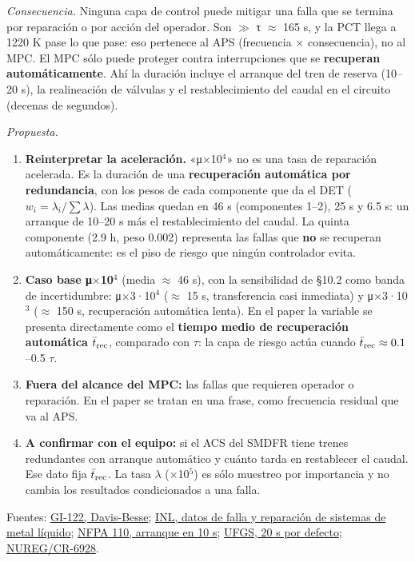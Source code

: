 \documentclass[11pt,a4paper]{article}
\begin{document}
\emph{Consecuencia.} Ninguna capa de control puede mitigar una falla que se termina por reparación o por acción del operador. Son $\gg$ τ $\approx$ 165 s, y la PCT llega a 1220 K pase lo que pase: eso pertenece al APS (frecuencia $\times$ consecuencia), no al MPC. El MPC sólo puede proteger contra interrupciones que se \textbf{recuperan automáticamente}. Ahí la duración incluye el arranque del tren de reserva (10–20 s), la realineación de válvulas y el restablecimiento del caudal en el circuito (decenas de segundos).

\emph{Propuesta.}

\begin{enumerate}
\item \textbf{Reinterpretar la aceleración.} «μ$\times$10$^{4}$» no es una tasa de reparación acelerada. Es la duración de una \textbf{recuperación automática por redundancia}, con los pesos de cada componente que da el DET ($w_i=\lambda_i/\sum\lambda$). Las medias quedan en 46 s (componentes 1–2), 25 s y 6.5 s: un arranque de 10–20 s más el restablecimiento del caudal. La quinta componente (2.9 h, peso 0.002) representa las fallas que \textbf{no} se recuperan automáticamente: es el piso de riesgo que ningún controlador evita.
\item \textbf{Caso base μ$\times$10$^{4}$} (media $\approx$ 46 s), con la sensibilidad de \S{}10.2 como banda de incertidumbre: μ$\times$3·10$^{4}$ ($\approx$ 15 s, transferencia casi inmediata) y μ$\times$3·10$^{3}$ ($\approx$ 150 s, recuperación automática lenta). En el paper la variable se presenta directamente como el \textbf{tiempo medio de recuperación automática} $\bar t_{\rm rec}$, comparado con $\tau$: la capa de riesgo actúa cuando $\bar t_{\rm rec}\approx0.1$–0.5 $\tau$.
\item \textbf{Fuera del alcance del MPC:} las fallas que requieren operador o reparación. En el paper se tratan en una frase, como frecuencia residual que va al APS.
\item \textbf{A confirmar con el equipo:} si el ACS del SMDFR tiene trenes redundantes con arranque automático y cuánto tarda en restablecer el caudal. Ese dato fija $\bar t_{\rm rec}$. La tasa $\lambda$ ($\times$10$^{5}$) es sólo muestreo por importancia y no cambia los resultados condicionados a una falla.
\end{enumerate}

Fuentes: \href{https://www.nrc.gov/sr0933/section-3-new-generic-issues/issue-122-davis-besse-loss-all-feedwater-event-june-9-1985-short-term-actions-potential-inability}{GI-122, Davis-Besse}; \href{https://inldigitallibrary.inl.gov/sites/sti/sti/6760037.pdf}{INL, datos de falla y reparación de sistemas de metal líquido}; \href{https://www.cummins.com/sites/default/files/2019-04/FAQ_NFPA\%20110\%20Time\%20to\%20Readiness.pdf}{NFPA 110, arranque en 10 s}; \href{https://ufgscriteriadocreport.tpub.com/16263A/16263A0064.htm}{UFGS, 20 s por defecto}; \href{https://www.nrc.gov/reading-rm/doc-collections/nuregs/contract/cr6928/index}{NUREG/CR-6928}.
\end{document}
